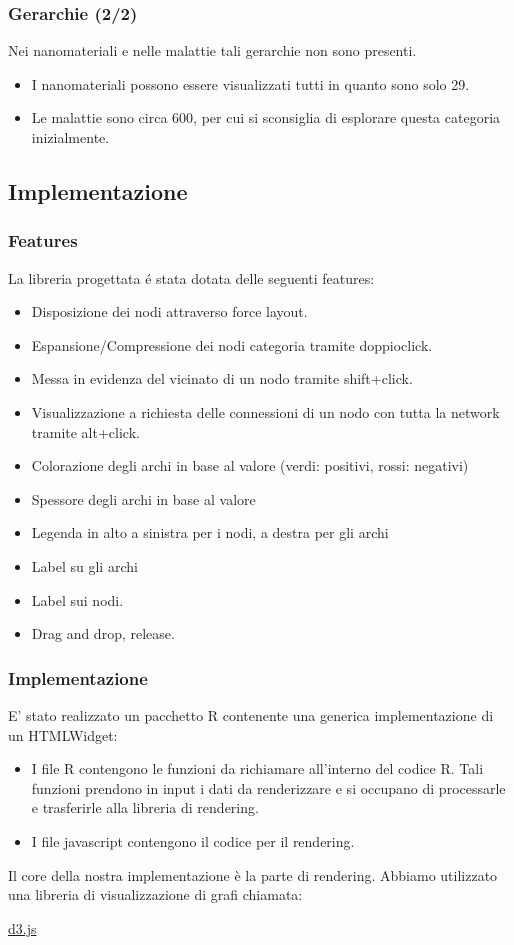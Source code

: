 \documentclass{beamer}
\begin{document}
\begin{frame}
\frametitle{Gerarchie (2/2)}
Nei nanomateriali e nelle malattie tali gerarchie non sono presenti.
\begin{itemize}
\item I nanomateriali possono essere visualizzati tutti in quanto sono solo 29.
\item Le malattie sono circa 600, per cui si sconsiglia di esplorare questa categoria inizialmente.
\end{itemize}
\medskip
\end{frame}

\subsection{Implementazione}
\begin{frame}
\frametitle{Features}
La libreria progettata \'e stata dotata delle seguenti features:
\begin{itemize}
\item Disposizione dei nodi attraverso force layout.
\item Espansione/Compressione dei nodi categoria tramite doppioclick.
\item Messa in evidenza del vicinato di un nodo tramite shift+click.
\item Visualizzazione a richiesta delle connessioni di un nodo con tutta la network tramite alt+click.
\item Colorazione degli archi in base al valore (verdi: positivi, rossi: negativi)
\item Spessore degli archi in base al valore
\item Legenda in alto a sinistra per i nodi, a destra per gli archi
\item Label su gli archi
\item Label sui nodi.
\item Drag and drop, release.
\end{itemize}
\end{frame}

\begin{frame}
\frametitle{Implementazione}
E' stato realizzato un pacchetto R contenente una generica implementazione di un \alert{HTMLWidget}:
\begin{itemize}
	\item I file R contengono le funzioni da richiamare all'interno del codice R. Tali funzioni prendono in input i dati da renderizzare e si occupano di processarle e trasferirle alla libreria di rendering.
	\item I file javascript contengono il codice per il rendering.
\end{itemize}

Il core della nostra implementazione è la parte di rendering. Abbiamo utilizzato una libreria di visualizzazione di grafi chiamata:
\begin{center}
\href{http://d3js.org/}{d3.js}
\end{center}
\end{frame}
\end{document}
